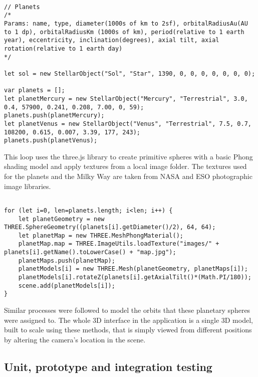 \documentclass[twoside]{bhamthesis}
\begin{document}
\begin{lstlisting}[label=Instances of the StellarObject class, caption=The planets as instances of the StellarObject class, captionpos=b]

// Planets
/*
Params: name, type, diameter(1000s of km to 2sf), orbitalRadiusAu(AU to 1 dp), orbitalRadiusKm (1000s of km), period(relative to 1 earth year), eccentricity, inclination(degrees), axial tilt, axial rotation(relative to 1 earth day)
*/

let sol = new StellarObject("Sol", "Star", 1390, 0, 0, 0, 0, 0, 0, 0);

var planets = [];
let planetMercury = new StellarObject("Mercury", "Terrestrial", 3.0, 0.4, 57900, 0.241, 0.208, 7.00, 0, 59);
planets.push(planetMercury);
let planetVenus = new StellarObject("Venus", "Terrestrial", 7.5, 0.7, 108200, 0.615, 0.007, 3.39, 177, 243);
planets.push(planetVenus);

\end{lstlisting}

This loop uses the three.js library to create primitive spheres with a basic Phong shading model and apply textures from a local image folder.  The textures used for the planets and the Milky Way are taken from NASA and ESO photographic image libraries.


\begin{lstlisting}[label=Loop using three.js objects and methods to create planetary spheres, caption=Loop using three.js objects and methods to create planetary spheres, captionpos=b]

for (let i=0, len=planets.length; i<len; i++) {
	let planetGeometry = new THREE.SphereGeometry((planets[i].getDiameter()/2), 64, 64);
	let planetMap = new THREE.MeshPhongMaterial();
	planetMap.map = THREE.ImageUtils.loadTexture("images/" + planets[i].getName().toLowerCase() + "map.jpg");
	planetMaps.push(planetMap);
	planetModels[i] = new THREE.Mesh(planetGeometry, planetMaps[i]);
	planetModels[i].rotateZ(planets[i].getAxialTilt()*(Math.PI/180));
	scene.add(planetModels[i]);
}

\end{lstlisting}

Similar processes were followed to model the orbits that these planetary spheres were assigned to. The whole 3D interface in the application is a single 3D model, built to scale using these methods, that is simply viewed from different positions by altering the camera's location in the scene.


\subsection{Unit, prototype and integration testing}
\end{document}
